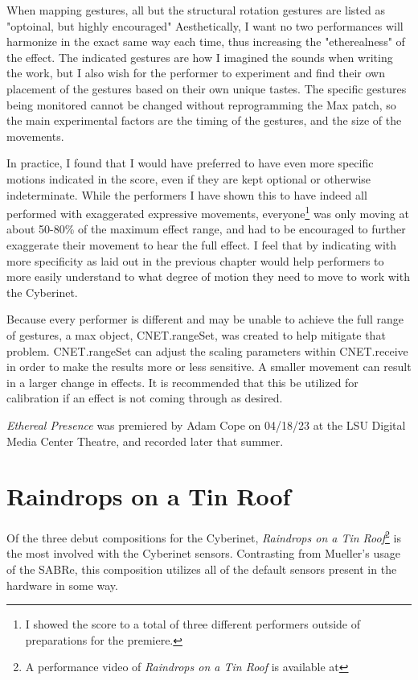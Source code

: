 When mapping gestures, all but the structural rotation gestures are listed as "optoinal, but highly encouraged" Aesthetically, I want no two performances will harmonize in the exact same way each time, thus increasing the "etherealness" of the effect. The indicated gestures are how I imagined the sounds when writing the work, but I also wish for the performer to experiment and find their own placement of the gestures based on their own unique tastes. The specific gestures being monitored cannot be changed without reprogramming the Max patch, so the main experimental factors are the timing of the gestures, and the size of the movements.

In practice, I found that I would have preferred to have even more specific motions indicated in the score, even if they are kept optional or otherwise indeterminate. While the performers I have shown this to have indeed all performed with exaggerated expressive movements, everyone\footnote{I showed the score to a total of three different performers outside of preparations for the premiere.} was only moving at about 50-80\% of the maximum effect range, and had to be encouraged to further exaggerate their movement to hear the full effect. I feel that by indicating with more specificity as laid out in the previous chapter would help performers to more easily understand to what degree of motion they need to move to work with the Cyberinet. 

Because every performer is different and may be unable to achieve the full range of gestures, a max object, CNET.rangeSet, was created to help mitigate that problem. CNET.rangeSet can adjust the scaling parameters within CNET.receive in order to make the results more or less sensitive. A smaller movement can result in a larger change in effects. It is recommended that this be utilized for calibration if an effect is not coming through as desired.


\textit{Ethereal Presence} was premiered by Adam Cope on 04/18/23 at the LSU Digital Media Center Theatre, and recorded later that summer.

\section{Raindrops on a Tin Roof}
Of the three debut compositions for the Cyberinet, \textit{Raindrops on a Tin Roof}\footnote{A performance video of \textit{Raindrops on a Tin Roof} is available at} is the most involved with the Cyberinet sensors. Contrasting from Mueller's usage of the SABRe, this composition utilizes all of the default sensors present in the hardware in some way. 

